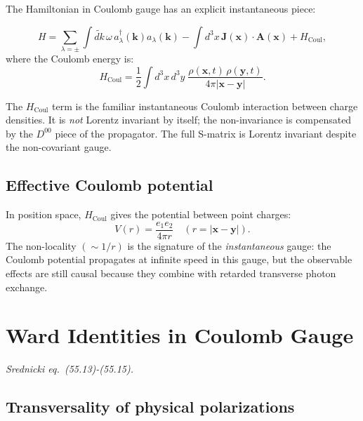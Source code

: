 \documentclass[12pt]{article}
\begin{document}
The Hamiltonian in Coulomb gauge has an explicit instantaneous piece:

\begin{mdframed}[backgroundcolor=blue!5]
\begin{equation}\label{eq:coulomb-hamiltonian}
  H = \sum_{\lambda=\pm}\int\!\widetilde{dk}\,\omega\, a^\dagger_\lambda(\mathbf{k})a_\lambda(\mathbf{k})
    - \int d^3x\,\mathbf{J}(\mathbf{x})\cdot\mathbf{A}(\mathbf{x})
    + H_\text{Coul},
\end{equation}
where the Coulomb energy is:
\begin{equation}\label{eq:coulomb-energy}
  H_\text{Coul} = \frac{1}{2}\int d^3x\,d^3y\;
  \frac{\rho(\mathbf{x},t)\,\rho(\mathbf{y},t)}{4\pi|\mathbf{x}-\mathbf{y}|}.
\end{equation}
\end{mdframed}

The $H_\text{Coul}$ term is the familiar instantaneous Coulomb interaction between
charge densities.  It is \emph{not} Lorentz invariant by itself; the non-invariance
is compensated by the $D^{00}$ piece of the propagator.  The full S-matrix is Lorentz
invariant despite the non-covariant gauge.

\subsection{Effective Coulomb potential}

In position space, $H_\text{Coul}$ gives the potential between point charges:
\begin{equation}
  V(r) = \frac{e_1 e_2}{4\pi r} \quad (r = |\mathbf{x}-\mathbf{y}|).
\end{equation}
The non-locality $(\sim 1/r)$ is the signature of the \emph{instantaneous} gauge:
the Coulomb potential propagates at infinite speed in this gauge, but the
observable effects are still causal because they combine with retarded transverse
photon exchange.

\section{Ward Identities in Coulomb Gauge}

\textit{Srednicki eq.\ (55.13)-(55.15).}

\subsection{Transversality of physical polarizations}
\end{document}
